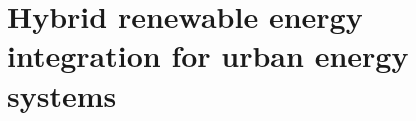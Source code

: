 \part{Hybrid renewable energy \mbox{integration} for urban energy systems}
\label{hybrid}

\cleardoublepage


\cleardoublepage
{}

%
\backmatter




